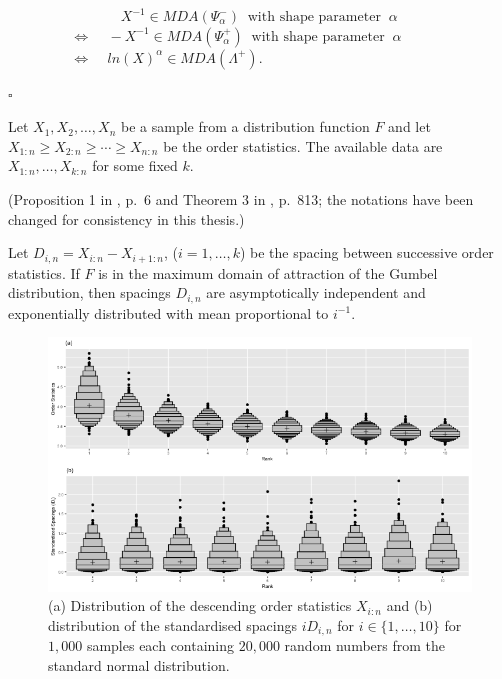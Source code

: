 \documentclass{monashthesis}
\theoremstyle{definition}
\theoremstyle{definition}
\theoremstyle{definition}
\theoremstyle{remark}
\let\BeginKnitrBlock\begin \let\EndKnitrBlock\end
\begin{document}
\begin{flushleft}
        $\;\;\;\;\;\;\;\;\;\;\;\;\;\;\;\;\;\;\;\;\;\;\;\;\;\;\;\;\; X^{-1} \in MDA(\varPsi_{\alpha}^{-})\;\; \text{with shape parameter}\;\;\alpha$\\[0.3cm]

    $\;\;\;\;\;\;\;\;\;\;\;\;\;\;\;\;\Longleftrightarrow \;\;\;\; -X^{-1} \in MDA(\varPsi_{\alpha}^{+})\;\; \text{with shape parameter}\;\;\alpha$\\[0.3cm]

    $\;\;\;\;\;\;\;\;\;\;\;\;\;\;\;\;\Longleftrightarrow \;\;\;\; ln(X)^{\alpha} \in MDA(\varLambda^{+}).$

\end{flushleft}

\begin{flushright}
    $\square$
\end{flushright}

Let \(X_{1},X_{2},\dots, X_{n}\) be a sample from a distribution function \(F\) and let \(X_{1:n}\geqslant X_{2:n}\geqslant \cdots \geqslant X_{n:n}\) be the order statistics. The available data are \(X_{1:n},\dots,X_{k:n}\) for some fixed \(k.\)

\BeginKnitrBlock{theorem}[Spacing theorem]
\protect\hypertarget{thm:spacingtheorem}{}{\label{thm:spacingtheorem} {} }(Proposition 1 in \textcite{burridge2006additive}, p.~6 and Theorem 3 in \textcite{weissman1978estimation}, p.~813; the notations have been changed for consistency in this thesis.)

Let \(D_{i,n} = X_{i:n} - X_{i+1:n}\), (\(i=1,\dots,k\)) be the spacing between successive order statistics. If \(F\) is in the maximum domain of attraction of the Gumbel distribution, then spacings \(D_{i,n}\) are asymptotically independent and exponentially distributed with mean proportional to \(i^{-1}\).
\EndKnitrBlock{theorem}

\begin{figure}[h]

{\centering \includegraphics[width=1\linewidth]{figure/spacings-1} 

}

\caption{(a) Distribution of the descending order statistics $X_{i:n}$ and (b) distribution of the standardised spacings $iD_{i,n}$ for $i \in \{1,\dots,10\}$ for $1,000$ samples each containing $20,000$ random numbers from the standard normal distribution.}\label{fig:spacings}
\end{figure}
\end{document}
